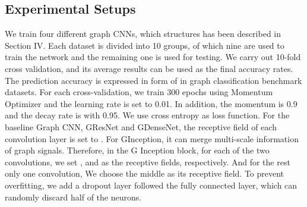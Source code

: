 \documentclass[journal]{IEEEtran}
\begin{document}
\subsection{Experimental Setups}
We train four different graph CNNs, which structures has been described in Section IV. Each dataset is divided into 10 groups, of which nine are used to train the network and the remaining one is used for testing.
We carry out 10-fold cross validation, and its average results can be used as the final accuracy rates.
The prediction accuracy is expressed in form of  in graph classification benchmark datasets.
For each cross-validation, we train 300 epochs using Momentum Optimizer and the learning rate is set to 0.01. In addition, the momentum is 0.9 and the decay rate is with 0.95. We use cross entropy as loss function.
For the baseline Graph CNN, G\underline{\hspace{0.5em}}ResNet and G\underline{\hspace{0.5em}}DenseNet, the receptive field of each convolution layer is set to .
For G\underline{\hspace{0.5em}}Inception, it can merge multi-scale information of graph signals. Therefore, in the G\underline{\hspace{0.5em}} Inception block, for each of the two convolutions, we set ,  and  as the receptive fields, respectively. And for the rest only one convolution, We choose the middle  as its receptive field. To prevent overfitting, we add a dropout layer followed the fully connected layer, which can randomly discard half of the neurons.
\end{document}
